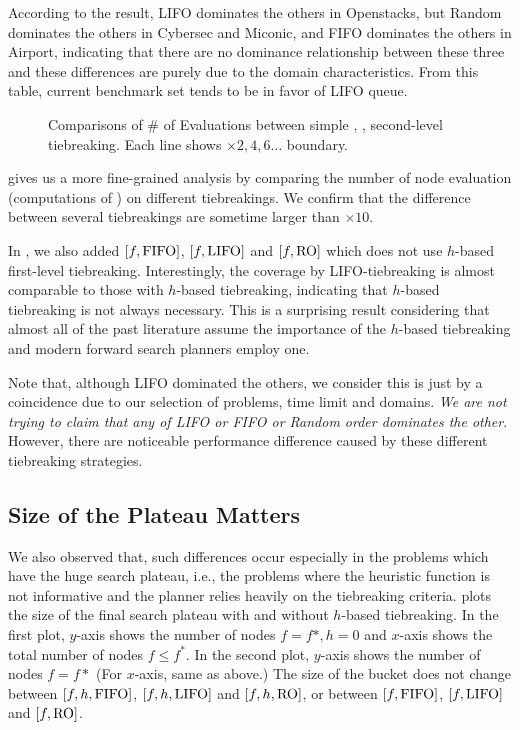 According to the result, LIFO dominates the others in Openstacks, but
Random dominates the others in Cybersec and Miconic, and FIFO dominates
the others in Airport, indicating that there are no dominance
relationship between these three and these differences are purely due to
the domain characteristics.  From this table, current benchmark set
tends to be in favor of LIFO queue.

\begin{figure}[htbp]
 \centering {}
 
 \caption{Comparisons of \# of Evaluations between simple \lifo, \fifo,
 \ro second-level tiebreaking. Each line shows $\times 2,4,6\ldots$ boundary.}
 \label{f-h-eval}
\end{figure}

 gives us a more fine-grained analysis by comparing the
number of node evaluation (computations of \lmcut) on
different tiebreakings. We confirm that the difference between several
tiebreakings are sometime larger than $\times 10$.

In , we also added $[f,\mbox{FIFO}]$, $[f,\mbox{LIFO}]$ and
$[f,\mbox{RO}]$ which does not use $h$-based first-level tiebreaking.
Interestingly, the coverage by LIFO-tiebreaking is almost comparable to
those with $h$-based tiebreaking, indicating that $h$-based tiebreaking
is not always necessary.  This is a surprising result considering
that almost all of the past literature assume the importance of the
$h$-based tiebreaking and modern forward search planners employ one.

Note that, although LIFO dominated the others, we consider this is just
by a coincidence due to our selection of problems, time limit and
domains. \emph{We are not trying to claim that any of LIFO or FIFO or
Random order dominates the other}. However, there are noticeable
performance difference caused by these different tiebreaking strategies.

\subsection{Size of the Plateau Matters}

We also observed that, such differences occur especially in the problems which
have the huge search plateau, i.e., the problems where the heuristic
function is not informative and the planner relies heavily on the
tiebreaking criteria.
% 
 plots the size of the final search plateau with and
without $h$-based tiebreaking. In the first plot, $y$-axis shows the
number of nodes $f=f*, h=0$ and $x$-axis shows the total number of nodes
$f\leq f^*$.  In the second plot, $y$-axis shows the number of nodes
$f=f*$ (For $x$-axis, same as above.)  The size of the bucket does not
change between $[f,h,\mbox{FIFO}]$, $[f,h,\mbox{LIFO}]$ and $[f,h,\mbox{RO}]$, or between
$[f,\mbox{FIFO}]$, $[f,\mbox{LIFO}]$ and $[f,\mbox{RO}]$.

